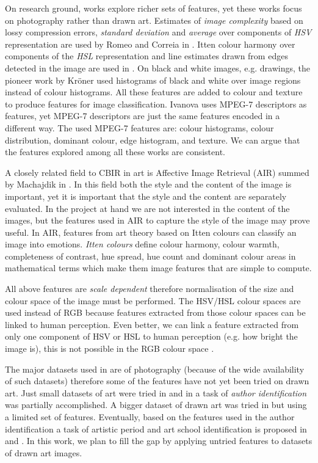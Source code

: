 \documentclass[a4paper,twocolumn]{article}
\begin{document}
On research ground, works explore richer sets of features, yet these works
focus on photography rather than drawn art.  Estimates of \emph{image
complexity} based on lossy compression errors, \emph{standard deviation} and
\emph{average} over components of \emph{HSV} representation are used by Romeo
and Correia in \cite{jma12clas,cmrc13fs,rmc12ajs}.  Itten colour harmony over
components of the \emph{HSL} representation and line estimates drawn from edges
detected in the image are used in \cite{mach10clas}.  On black and white
images, e.g.  drawings, the pioneer work by Kr\"oner \cite{kroner98draw} used
histograms of black and white over image regions instead of colour histograms.
All these features are added to colour and texture to produce features for
image classification.  Ivanova \cite{isv12mpeg} uses MPEG-7 descriptors as
features, yet MPEG-7 descriptors are just the same features encoded in a
different way.  The used MPEG-7 features are: colour histograms, colour
distribution, dominant colour, edge histogram, and texture.  We can argue that
the features explored among all these works are consistent.

A closely related field to CBIR in art is Affective Image Retrieval (AIR)
summed by Machajdik in \cite{mach10ua,mach10clas}.  In this field both the
style and the content of the image is important, yet it is important that the
style and the content are separately evaluated.  In the project at hand we are
not interested in the content of the images, but the features used in AIR to
capture the style of the image may prove useful.  In AIR, features from art
theory based on Itten colours can classify an image into emotions.  \emph{Itten
colours} define colour harmony, colour warmth, completeness of contrast, hue
spread, hue count and dominant colour areas in mathematical terms which make
them image features that are simple to compute.

All above features are \emph{scale dependent} \cite{jma12clas,mach10clas}
therefore normalisation of the size and colour space of the image must be
performed.  The HSV/HSL colour spaces are used instead of RGB because features
extracted from those colour spaces can be linked to human perception.  Even
better, we can link a feature extracted from only one component of HSV or HSL
to human perception (e.g. how bright the image is), this is not possible in the
RGB colour space \cite{rmc12ajs}.

The major datasets used in \cite{rmc12ajs,mach10clas} are of photography
(because of the wide availability of such datasets) therefore some of the
features have not yet been tried on drawn art.  Just small datasets of art were
tried in \cite{mach10clas} and in \cite{rmc12ajs} a task of \emph{author
identification} was partially accomplished.  A bigger dataset of drawn art was
tried in \cite{zirnhelt07art} but using a limited set of features.  Eventually,
based on the features used in the author identification a task of artistic
period and art school identification is proposed in \cite{zirnhelt07art} and
\cite{rmc12ajs}.  In this work, we plan to fill the gap by applying untried
features to datasets of drawn art images.
\end{document}
